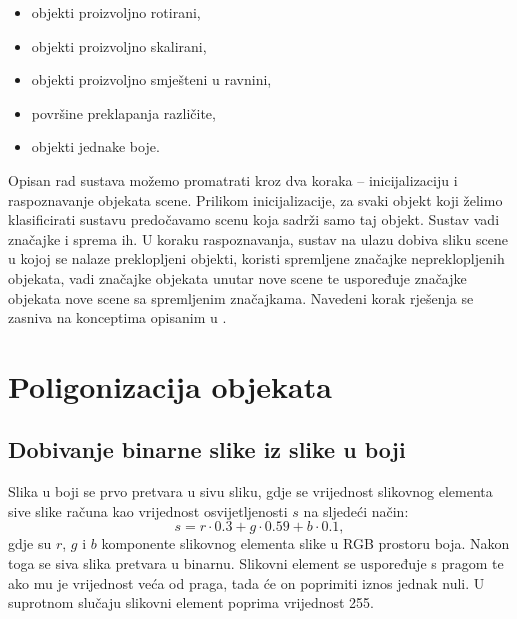 \documentclass[lmodern, utf8, seminar, numeric]{fer}
\begin{document}
\begin{itemize}
\item objekti proizvoljno rotirani,
\item objekti proizvoljno skalirani,
\item objekti proizvoljno smješteni u ravnini,
\item površine preklapanja različite,
\item objekti jednake boje.
\end{itemize}

Opisan rad sustava možemo promatrati kroz dva koraka -- inicijalizaciju i
raspoznavanje objekata scene. Prilikom inicijalizacije, za svaki objekt koji
želimo klasificirati sustavu predočavamo scenu koja sadrži samo taj objekt.
Sustav vadi značajke i sprema ih. U koraku raspoznavanja, sustav na ulazu dobiva
sliku scene u kojoj se nalaze preklopljeni objekti, koristi spremljene značajke
nepreklopljenih objekata, vadi značajke objekata unutar nove scene te uspoređuje
značajke objekata nove scene sa spremljenim značajkama. Navedeni korak rješenja
se zasniva na konceptima opisanim u \citep{ayache2009hyper}.


\section{Poligonizacija objekata}

\subsection{Dobivanje binarne slike iz slike u boji}
Slika u boji se prvo pretvara u sivu sliku, gdje se vrijednost slikovnog
elementa sive slike računa kao vrijednost osvijetljenosti  
$s$ na sljedeći način:
$$s = r \cdot 0.3 + g \cdot 0.59 + b \cdot 0.1,$$
gdje su $r$, $g$ i $b$ komponente slikovnog elementa slike u RGB prostoru boja.
Nakon toga se siva slika pretvara u binarnu. Slikovni element se uspoređuje s
pragom te ako mu je vrijednost veća od praga, tada će on poprimiti iznos jednak
nuli. U suprotnom slučaju slikovni element poprima vrijednost 255.
\end{document}
